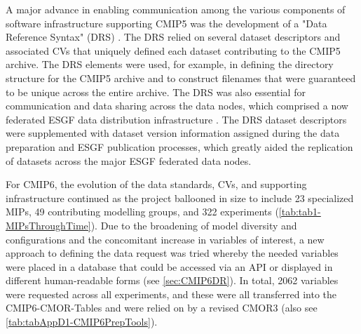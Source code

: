 \documentclass[gmd, preprint]{copernicus}
\begin{document}
A major advance in enabling communication among the various components of software infrastructure supporting CMIP5 was the development of a "Data Reference Syntax" (DRS) \citep{taylor_pcmdi_2012}. The DRS relied on several dataset descriptors and associated CVs that uniquely defined each dataset contributing to the CMIP5 archive. The DRS elements were used, for example, in defining the directory structure for the CMIP5 archive and to construct filenames that were guaranteed to be unique across the entire archive. The DRS was also essential for communication and data sharing across the data nodes, which comprised a now federated ESGF data distribution infrastructure \citep{williams_earth_2011}. The DRS dataset descriptors were supplemented with dataset version information assigned during the data preparation and ESGF publication processes, which greatly aided the replication of datasets across the major ESGF federated data nodes.

For CMIP6, the evolution of the data standards, CVs, and supporting infrastructure continued as the project ballooned in size to include 23 specialized MIPs, 49 contributing modelling groups, and 322 experiments (\autoref{tab:tab1-MIPsThroughTime}). Due to the broadening of model diversity and configurations and the concomitant increase in variables of interest, a new approach to defining the data request was tried whereby the needed variables were placed in a database that could be accessed via an API or displayed in different human-readable forms (see \autoref{sec:CMIP6DR}). In total, 2062 variables were requested across all experiments, and these were all transferred into the CMIP6-CMOR-Tables \citep{nadeau_cmip6_2017} and were relied on by a revised CMOR3 \citep{mauzey_cmor_2024} (also see \autoref{tab:tabAppD1-CMIP6PrepTools}).
\end{document}
